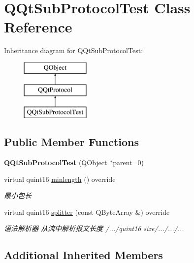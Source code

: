 \hypertarget{class_q_qt_sub_protocol_test}{}\section{Q\+Qt\+Sub\+Protocol\+Test Class Reference}
\label{class_q_qt_sub_protocol_test}
Inheritance diagram for Q\+Qt\+Sub\+Protocol\+Test\+:\begin{figure}[H]
\begin{center}
\leavevmode
\includegraphics[height=3.000000cm]{class_q_qt_sub_protocol_test}
\end{center}
\end{figure}
\subsection*{Public Member Functions}
\begin{DoxyCompactItemize}
\item 
\mbox{\label{class_q_qt_sub_protocol_test_a3355a6f79478f4329f7992d75f9f7e23}} 
{\bfseries Q\+Qt\+Sub\+Protocol\+Test} (Q\+Object $\ast$parent=0)
\item 
virtual quint16 \mbox{\hyperlink{class_q_qt_sub_protocol_test_a42b8ca064326139d26bc20e76f356a6a}{minlength}} () override
\begin{DoxyCompactList}\small\item\em 最小包长 \end{DoxyCompactList}\item 
virtual quint16 \mbox{\hyperlink{class_q_qt_sub_protocol_test_aaf24e5745a46de9a5d6dd4ba06a5603c}{splitter}} (const Q\+Byte\+Array \&) override
\begin{DoxyCompactList}\small\item\em 语法解析器 从流中解析报文长度 /.../quint16 size/.../.../... \end{DoxyCompactList}\end{DoxyCompactItemize}
\subsection*{Additional Inherited Members}


